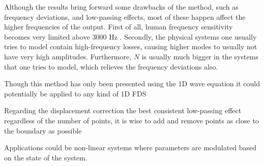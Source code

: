 Although the results bring forward some drawbacks of the method, such as frequency deviations, and low-passing effects, most of these happen affect the higher frequencies of the output. First of all, human frequency sensitivity becomes very limited above 3000 Hz \cite{Zwicker1990}. Secondly, the physical systems one usually tries to model contain high-frequency losses, causing higher modes to usually not have very high amplitudes. Furthermore, $N$ is usually much bigger in the systems that one tries to model, which relieves the frequency deviations also. 


Though this method has only been presented using the 1D wave equation it could potentially be applied to any kind of 1D FDS 


Regarding the displacement correction the best consistent low-passing effect regardless of the number of points, it is wise to add and remove points as close to the boundary as possible

Applications could be non-linear systems where parameters are modulated based on the state of the system. 

